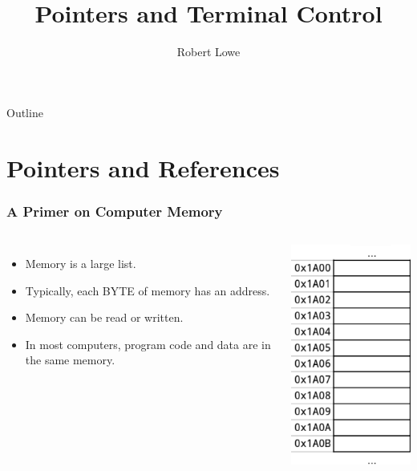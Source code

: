 \documentclass[handout]{beamer}
\title{Pointers and Terminal Control}
\author{Robert Lowe\\}
\institute[Maryville College] %
{
  Division of Mathematics and Computer Science\\
  Maryville College
}
\date[]{}
\begin{document}
\begin{frame}
  \titlepage
\end{frame}

\begin{frame}{Outline}
  \tableofcontents
\end{frame}





\section{Pointers and References}
\begin{frame}
    \frametitle{A Primer on Computer Memory}
    \begin{columns}
        \begin{itemize}
            \item Memory is a large list.
            \item Typically, each BYTE of memory has an address.
            \item Memory can be read or written.
            \item In most computers, program code and data are in the same memory.
        \end{itemize}
        \includegraphics[height=0.75\textheight]{images/memlist}
    \end{columns}
\end{frame}
\end{document}
